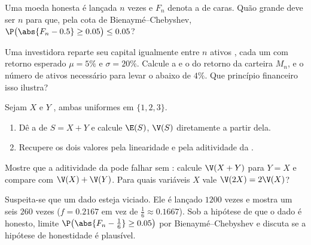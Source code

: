\begin{exercise}[$\star$]\label{exo:g12:sums:3}
Uma moeda honesta é lançada $n$ vezes e $F_n$ denota a  de
caras. Quão grande deve ser $n$ para que, pela cota de
Bienaymé--Chebyshev,
$\P\bigl(\abs{F_n - 0.5} \geq 0.05\bigr) \leq 0.05$?
\end{exercise}

\begin{exercise}[$\star\star$]\label{exo:g12:sums:4}
Uma investidora reparte seu capital igualmente entre $n$ ativos
, cada um com retorno esperado $\mu = 5\%$ e 
$\sigma = 20\%$. Calcule a  e o  do retorno da
carteira $M_n$, e o número de ativos necessário para levar o 
abaixo de $4\%$. Que princípio financeiro isso ilustra?
\end{exercise}

\begin{exercise}[$\star\star$]\label{exo:g12:sums:5}
Sejam $X$ e $Y$ , ambas uniformes em $\{1, 2, 3\}$.
\begin{enumerate}
  \item Dê a  de $S = X + Y$ e calcule $\E(S)$, $\V(S)$
        diretamente a partir dela.
  \item Recupere os dois valores pela linearidade e pela aditividade da
        .
\end{enumerate}
\end{exercise}

\begin{exercise}[$\star\star$]\label{exo:g12:sums:6}
Mostre que a aditividade da  pode falhar sem :
calcule $\V(X + Y)$ para $Y = X$ e compare com $\V(X) + \V(Y)$. Para quais
variáveis $X$ vale $\V(2X) = 2\V(X)$?
\end{exercise}

\begin{exercise}[$\star\star$]\label{exo:g12:sums:7}
Suspeita-se que um dado esteja viciado. Ele é lançado $1200$ vezes e
mostra um seis $260$ vezes ($f = 0.2167$ em vez de
$\frac16 \approx 0.1667$). Sob a hipótese de que o dado é honesto, limite
$\P\bigl(\abs{F_n - \frac16} \geq 0.05\bigr)$ por Bienaymé--Chebyshev e
discuta se a hipótese de honestidade é plausível.
\end{exercise}

